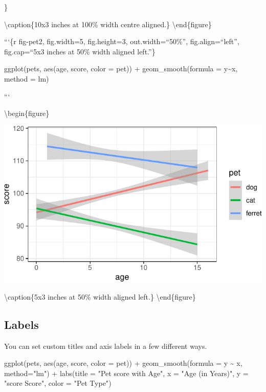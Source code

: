 \documentclass[
  oneside]{book}
\newenvironment{Shaded}{\begin{snugshade}}{\end{snugshade}}
\newcommand{\AttributeTok}[1]{\textcolor[rgb]{0.77,0.63,0.00}{#1}}
\newcommand{\FunctionTok}[1]{\textcolor[rgb]{0.00,0.00,0.00}{#1}}
\newcommand{\NormalTok}[1]{#1}
\newcommand{\SpecialCharTok}[1]{\textcolor[rgb]{0.00,0.00,0.00}{#1}}
\newcommand{\StringTok}[1]{\textcolor[rgb]{0.31,0.60,0.02}{#1}}
\begin{document}
\}

\textbackslash caption\{10x3 inches at 100\% width centre aligned.\}\label{fig:fig-chunk-example1-out}
\textbackslash end\{figure\}

```\{r fig-pet2, fig.width=5, fig.height=3, out.width=``50\%'', fig.align=``left'', fig.cap=``5x3 inches at 50\% width aligned left.''\}

\begin{Shaded}
\begin{Highlighting}[]
\FunctionTok{ggplot}\NormalTok{(pets, }\FunctionTok{aes}\NormalTok{(age, score, }\AttributeTok{color =}\NormalTok{ pet)) }\SpecialCharTok{+}
  \FunctionTok{geom\_smooth}\NormalTok{(}\AttributeTok{formula =}\NormalTok{ y}\SpecialCharTok{\textasciitilde{}}\NormalTok{x, }\AttributeTok{method =}\NormalTok{ lm)}
\end{Highlighting}
\end{Shaded}

```

\textbackslash begin\{figure\}

\includegraphics[width=0.5\linewidth]{images/fig-chunk-example2-out-1} \hfill{}

\textbackslash caption\{5x3 inches at 50\% width aligned left.\}\label{fig:fig-chunk-example2-out}
\textbackslash end\{figure\}

\hypertarget{custom-labels}{%
\subsection{Labels}\label{custom-labels}}

You can set custom titles and axis labels in a few different ways.

\begin{Shaded}
\begin{Highlighting}[]
\FunctionTok{ggplot}\NormalTok{(pets, }\FunctionTok{aes}\NormalTok{(age, score, }\AttributeTok{color =}\NormalTok{ pet)) }\SpecialCharTok{+}
  \FunctionTok{geom\_smooth}\NormalTok{(}\AttributeTok{formula =}\NormalTok{ y }\SpecialCharTok{\textasciitilde{}}\NormalTok{ x, }\AttributeTok{method=}\StringTok{"lm"}\NormalTok{) }\SpecialCharTok{+}
  \FunctionTok{labs}\NormalTok{(}\AttributeTok{title =} \StringTok{"Pet score with Age"}\NormalTok{,}
       \AttributeTok{x =} \StringTok{"Age (in Years)"}\NormalTok{,}
       \AttributeTok{y =} \StringTok{"score Score"}\NormalTok{,}
       \AttributeTok{color =} \StringTok{"Pet Type"}\NormalTok{)}
\end{Highlighting}
\end{Shaded}
\end{document}
